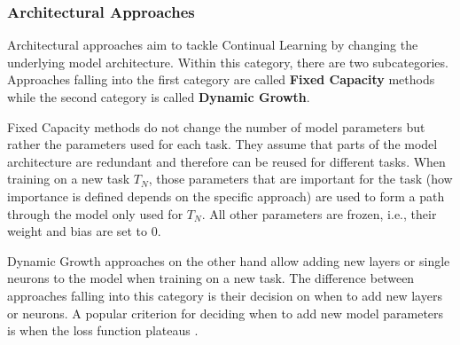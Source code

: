 \subsubsection{Architectural Approaches}
\label{sec:ArchitecturalApproaches}
Architectural approaches aim to tackle Continual Learning by changing the underlying model architecture. Within this category, there are two  
subcategories. Approaches falling into the first category are called \textbf{Fixed Capacity} methods while the second category is called
\textbf{Dynamic Growth}. \par
Fixed Capacity methods do not change the number of model parameters but rather the parameters used for each task. They assume that parts of
the model architecture are redundant and therefore can be reused for different tasks. When training on a new task $T_N$, those parameters that are
important for the task (how importance is defined depends on the specific approach) are used to form a path through the model only used for
$T_N$. All other parameters are frozen, i.e., their weight and bias are set to 0. \par
Dynamic Growth approaches on the other hand allow adding new layers or single neurons to the model when training on a new task. The difference between
approaches falling into this category is their decision on when to add new layers or neurons. A popular criterion for deciding when to add new model
parameters is when the loss function plateaus \cite{ash1989dynamic}.

